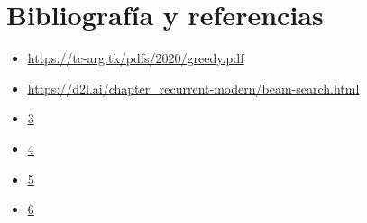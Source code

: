 \documentclass[10pt,twocolumn]{article}
\theoremstyle{definition}
\begin{document}
\newpage
\section{Bibliografía y referencias}

\begin{itemize}
    \item \url{https://tc-arg.tk/pdfs/2020/greedy.pdf}
    \item \url{https://d2l.ai/chapter_recurrent-modern/beam-search.html}
    \item \url{3}
    \item \url{4}
    \item \url{5}
    \item \url{6}
\end{itemize}
\end{document}
